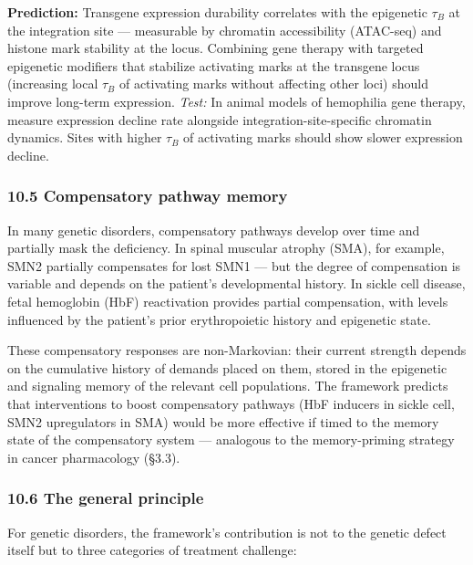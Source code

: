 \documentclass[
]{article}
\begin{document}
\textbf{Prediction:} Transgene expression durability correlates with the
epigenetic \(\tau_B\) at the integration site --- measurable by
chromatin accessibility (ATAC-seq) and histone mark stability at the
locus. Combining gene therapy with targeted epigenetic modifiers that
stabilize activating marks at the transgene locus (increasing local
\(\tau_B\) of activating marks without affecting other loci) should
improve long-term expression. \emph{Test:} In animal models of
hemophilia gene therapy, measure expression decline rate alongside
integration-site-specific chromatin dynamics. Sites with higher
\(\tau_B\) of activating marks should show slower expression decline.

\hypertarget{compensatory-pathway-memory}{%
\subsubsection{10.5 Compensatory pathway
memory}\label{compensatory-pathway-memory}}

In many genetic disorders, compensatory pathways develop over time and
partially mask the deficiency. In spinal muscular atrophy (SMA), for
example, SMN2 partially compensates for lost SMN1 --- but the degree of
compensation is variable and depends on the patient's developmental
history. In sickle cell disease, fetal hemoglobin (HbF) reactivation
provides partial compensation, with levels influenced by the patient's
prior erythropoietic history and epigenetic state.

These compensatory responses are non-Markovian: their current strength
depends on the cumulative history of demands placed on them, stored in
the epigenetic and signaling memory of the relevant cell populations.
The framework predicts that interventions to boost compensatory pathways
(HbF inducers in sickle cell, SMN2 upregulators in SMA) would be more
effective if timed to the memory state of the compensatory system ---
analogous to the memory-priming strategy in cancer pharmacology (§3.3).

\hypertarget{the-general-principle}{%
\subsubsection{10.6 The general principle}\label{the-general-principle}}

For genetic disorders, the framework's contribution is not to the
genetic defect itself but to three categories of treatment challenge:
\end{document}
